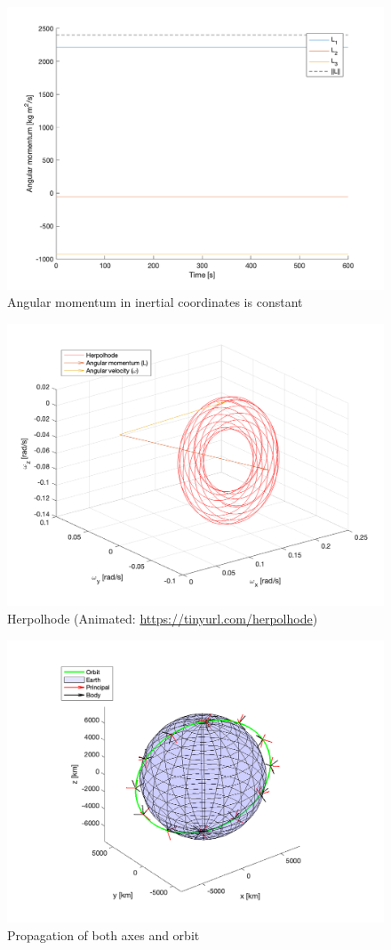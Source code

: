 \begin{figure}[H]
\centering
\includegraphics[scale=0.6]{Images/ps3_problem7a.png}
\caption{Angular momentum in inertial coordinates is constant}
\label{fig:ps3_problem7a}
\end{figure}

\begin{figure}[H]
\centering
\includegraphics[scale=0.6]{Images/ps3_problem7b.png}
\caption{Herpolhode (Animated: \protect\url{https://tinyurl.com/herpolhode})}
\label{fig:ps3_problem7b}
\end{figure}

\begin{figure}[H]
\centering
\includegraphics[scale=0.6]{Images/ps3_problem7c.png}
\caption{Propagation of both axes and orbit}
\label{fig:ps3_problem7c}
\end{figure}